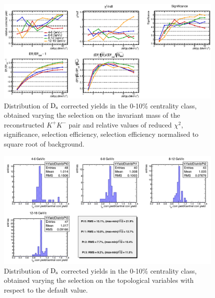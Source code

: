\begin{figure}[!h]
 \begin{center}
   \includegraphics[angle=0, width=15cm]{./FigCap5/cutbycut_invm_010.eps}
 \end{center}
 \caption{Distribution of ${\rm D_s}$ corrected yields in the 0-10\% centrality class, obtained varying the selection on the invariant mass of the reconstructed $K^+K^-$ pair and relative values of reduced $\chi^2$, significance, selection efficiency, selection efficiency normalised to square root of background.}
 \label{DsCutVar_010} 
\end{figure}
\begin{figure}[!h]
 \begin{center}
   \includegraphics[angle=0, width=15cm]{./FigCap5/FinalSyst_010.png}
 \end{center}
 \caption{Distribution of ${\rm D_s}$ corrected yields in the 0-10\% centrality class, obtained varying the selection on the topological variables with respect to the default value.}
 \label{fig:DsCutVar_010} 
\end{figure}


